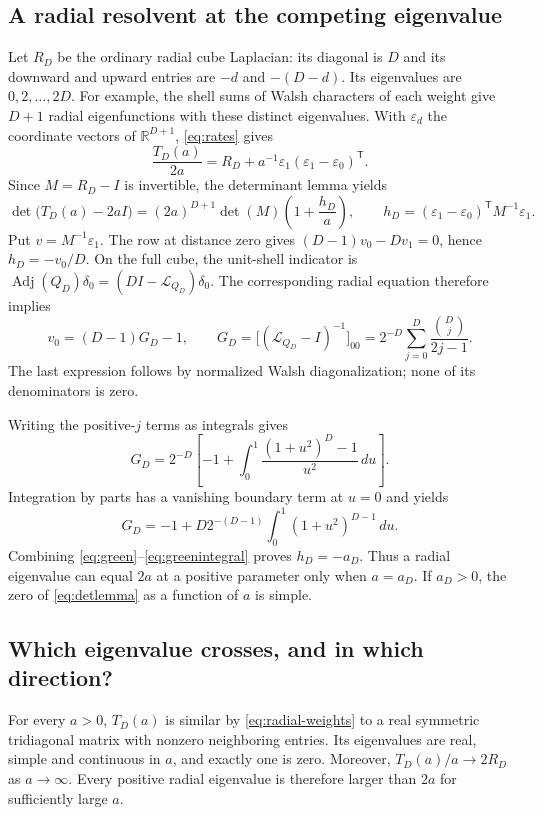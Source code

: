 \documentclass[11pt,a4paper]{article}
\begin{document}
\subsection{A radial resolvent at the competing eigenvalue}
Let $R_D$ be the ordinary radial cube Laplacian: its diagonal is $D$
and its downward and upward entries are $-d$ and $-(D-d)$. Its eigenvalues
are $0,2,\ldots,2D$. For example, the shell sums of Walsh characters of
each weight give $D+1$ radial eigenfunctions with these distinct
eigenvalues. With $\varepsilon_d$ the coordinate vectors of
$\mathbb R^{D+1}$, \eqref{eq:rates} gives
\begin{equation}\label{eq:rankone}
 \frac{T_D(a)}{2a}=R_D+a^{-1}\varepsilon_1
 (\varepsilon_1-\varepsilon_0)^{\mathsf T}.
\end{equation}
Since $M=R_D-I$ is invertible, the determinant lemma yields
\begin{equation}\label{eq:detlemma}
 \det\bigl(T_D(a)-2aI\bigr)
 =(2a)^{D+1}\det(M)\left(1+\frac{h_D}{a}\right),\qquad
 h_D=(\varepsilon_1-\varepsilon_0)^{\mathsf T}M^{-1}\varepsilon_1.
\end{equation}
Put $v=M^{-1}\varepsilon_1$. The row at distance zero gives
$(D-1)v_0-Dv_1=0$, hence $h_D=-v_0/D$.
On the full cube, the unit-shell indicator is
$\operatorname{Adj}(Q_D)\delta_0=(DI-\mathcal L_{Q_D})\delta_0$.
The corresponding radial equation therefore implies
\begin{equation}\label{eq:green}
 v_0=(D-1)G_D-1,\qquad
 G_D=\bigl[(\mathcal L_{Q_D}-I)^{-1}\bigr]_{00}
 =2^{-D}\sum_{j=0}^D\frac{\binom Dj}{2j-1}.
\end{equation}
The last expression follows by normalized Walsh diagonalization;
none of its denominators is zero.

Writing the positive-$j$ terms as integrals gives
\begin{equation}
 G_D=2^{-D}\left[-1+
 \int_0^1\frac{(1+u^2)^D-1}{u^2}\,du\right].
\end{equation}
Integration by parts has a vanishing boundary term at $u=0$ and yields
\begin{equation}\label{eq:greenintegral}
 G_D=-1+D2^{-(D-1)}\int_0^1(1+u^2)^{D-1}\,du.
\end{equation}
Combining \eqref{eq:green}--\eqref{eq:greenintegral} proves $h_D=-a_D$.
Thus a radial eigenvalue can equal $2a$ at a positive parameter only when
$a=a_D$. If $a_D>0$, the zero of
\eqref{eq:detlemma} as a function of $a$ is simple.

\subsection{Which eigenvalue crosses, and in which direction?}
For every $a>0$, $T_D(a)$ is similar by \eqref{eq:radial-weights} to a
real symmetric tridiagonal matrix with nonzero neighboring entries. Its
eigenvalues are real, simple and continuous in $a$, and exactly one is
zero. Moreover, $T_D(a)/a\to2R_D$ as $a\to\infty$. Every positive radial
eigenvalue is therefore larger than $2a$ for sufficiently large $a$.
\end{document}
